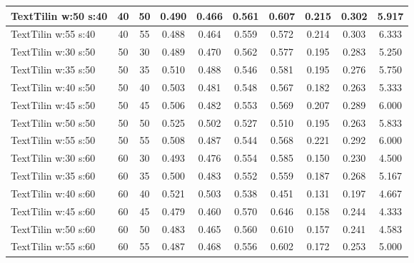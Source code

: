 \documentclass{article}
\begin{document}
\begin{longtable}[c]{|l|c|c|c|c|c|c|c|c|c|}
 TextTilin w:50 s:40 & 40 & 50 & 0.490 & 0.466 & 0.561 & 0.607 & 0.215 & 0.302 & 5.917  \\ \hline 
 TextTilin w:55 s:40 & 40 & 55 & 0.488 & 0.464 & 0.559 & 0.572 & 0.214 & 0.303 & 6.333  \\ \hline 
 TextTilin w:30 s:50 & 50 & 30 & 0.489 & 0.470 & 0.562 & 0.577 & 0.195 & 0.283 & 5.250  \\ \hline 
 TextTilin w:35 s:50 & 50 & 35 & 0.510 & 0.488 & 0.546 & 0.581 & 0.195 & 0.276 & 5.750  \\ \hline 
 TextTilin w:40 s:50 & 50 & 40 & 0.503 & 0.481 & 0.548 & 0.567 & 0.182 & 0.263 & 5.333  \\ \hline 
 TextTilin w:45 s:50 & 50 & 45 & 0.506 & 0.482 & 0.553 & 0.569 & 0.207 & 0.289 & 6.000  \\ \hline 
 TextTilin w:50 s:50 & 50 & 50 & 0.525 & 0.502 & 0.527 & 0.510 & 0.195 & 0.263 & 5.833  \\ \hline 
 TextTilin w:55 s:50 & 50 & 55 & 0.508 & 0.487 & 0.544 & 0.568 & 0.221 & 0.292 & 6.000  \\ \hline 
 TextTilin w:30 s:60 & 60 & 30 & 0.493 & 0.476 & 0.554 & 0.585 & 0.150 & 0.230 & 4.500  \\ \hline 
 TextTilin w:35 s:60 & 60 & 35 & 0.500 & 0.483 & 0.552 & 0.559 & 0.187 & 0.268 & 5.167  \\ \hline 
 TextTilin w:40 s:60 & 60 & 40 & 0.521 & 0.503 & 0.538 & 0.451 & 0.131 & 0.197 & 4.667  \\ \hline 
 TextTilin w:45 s:60 & 60 & 45 & 0.479 & 0.460 & 0.570 & 0.646 & 0.158 & 0.244 & 4.333  \\ \hline 
 TextTilin w:50 s:60 & 60 & 50 & 0.483 & 0.465 & 0.560 & 0.610 & 0.157 & 0.241 & 4.583  \\ \hline 
 TextTilin w:55 s:60 & 60 & 55 & 0.487 & 0.468 & 0.556 & 0.602 & 0.172 & 0.253 & 5.000  \\ \hline 
 \end{longtable} 
\newpage
\end{document}
